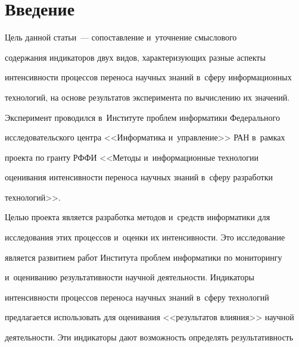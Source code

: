       \thispagestyle{headings}


      


      \vspace*{-16pt} 


     


\section{Введение}





\vspace*{-4pt}


     


     Цель данной статьи~--- сопоставление и~уточнение смыслового 


содержания индикаторов двух видов, характеризующих разные аспекты 


интенсивности процессов переноса научных знаний в~сферу информационных 


технологий, на основе результатов эксперимента по вычислению их значений. 


Эксперимент проводился в~Институте проблем информатики Федерального 


исследовательского центра <<Информатика и~управление>> РАН в~рамках 


проекта по гранту РФФИ <<Методы и~информационные технологии 


оценивания интенсивности переноса научных знаний в~сферу разработки 


технологий>>.


     


     Целью проекта является разработка методов и~средств информатики для 


исследования этих процессов и~оценки их интенсивности. Это исследование 


является развитием работ Института проблем информатики по мониторингу 


и~оцениванию результативности научной деятельности. Индикаторы 


интенсивности процессов переноса научных знаний в~сферу технологий 


предлагается использовать для оценивания <<результатов влияния>> научной 


деятельности. Эти индикаторы дают возможность определять результативность 


